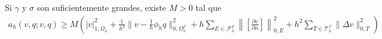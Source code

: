 \begin{prop} Si $\gamma$ y $\sigma$ son suficientemente grandes, existe $M>0$ tal que
	\[
	\begin{aligned}
		a_h(v,q;v,q) \geq M \left(|v|^2_{1,\Omega_h}		
		+ 	 \frac{1}{h^2}\|v-\frac{1}{h}\phi_h q\|^2_{0,\Omega^\Gamma_h} +
		h \sum_{E\in \mathcal{F}_h^\Gamma} \left\| \left[ \frac{\partial v}{\partial n} \right]\right \|^2_{0,E}+
		h^2 \sum_{T\in \mathcal{T}_h^\Gamma}  \|\Delta  v\|^2_{0,T}
		\right)
	\end{aligned}
	\]
\end{prop}
